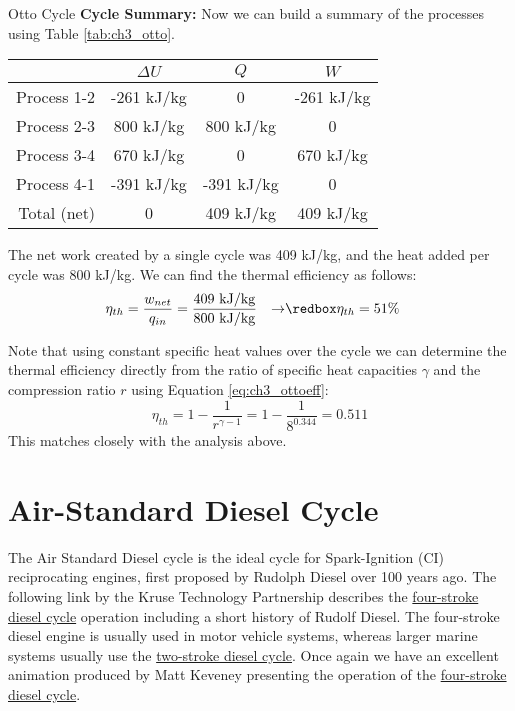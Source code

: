 \begin{example}[label=ex:ch3_otto]{Otto Cycle}
{\bf Cycle Summary:} Now we can build a summary of the processes using Table \ref{tab:ch3_otto}.
\begin{table}[H]
  \centering
\def\arraystretch{1.5}
\begin{tabular}{r|ccc}
            & $\Delta U$        & $Q$      &$W$     \\ \hline
Process 1-2 & -261 kJ/kg        & 0 &  -261 kJ/kg  \\
Process 2-3 & 800 kJ/kg   & 800 kJ/kg & 0               \\
Process 3-4 & 670 kJ/kg   & 0              &  670 kJ/kg \\ 
Process 4-1 & -391 kJ/kg   &  -391 kJ/kg &  0  \\ \hhline{=|===}
Total (net) & 0                 &  409 kJ/kg & 409 kJ/kg
\end{tabular}
\def\arraystretch{1.0}
\end{table}

The net work created by a single cycle was 409 kJ/kg, and the heat added per cycle was 800 kJ/kg.  We can find the thermal efficiency as follows:
\begin{align*}
  \eta_{th} &= \frac{w_{net}}{q_{in}} = \frac{409\ {\rm kJ/kg}}{800\ {\rm kJ/kg}} &\rightarrow& \redbox{\eta_{th} = 51\%}
\end{align*}

Note that using constant specific heat values over the cycle we can determine the thermal efficiency directly from the ratio of specific heat capacities $\gamma$ and the compression ratio $r$ using Equation \ref{eq:ch3_ottoeff}:
\begin{equation*} 
  \eta_{th} = 1 - \frac{1}{r^{\gamma-1}} = 1 - \frac{1}{8^{0.344}}= 0.511
\end{equation*}
This matches closely with the analysis above.

\end{example}



\section{Air-Standard Diesel Cycle}

The Air Standard Diesel cycle is the ideal cycle for Spark-Ignition (CI) reciprocating engines, first proposed by Rudolph Diesel over 100 years ago. The following link by the Kruse Technology Partnership describes the \href{http://www.kruse-ltc.com/diesel.php}{four-stroke diesel cycle} operation including a short history of Rudolf Diesel. The four-stroke diesel engine is usually used in motor vehicle systems, whereas larger marine systems usually use the \href{https://auto.howstuffworks.com/diesel-two-stroke1.htm}{two-stroke diesel cycle}. Once again we have an excellent animation produced by Matt Keveney presenting the operation of the \href{http://animatedengines.com/diesel.html}{four-stroke diesel cycle}.


